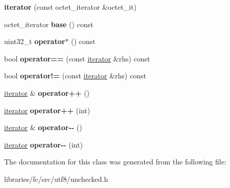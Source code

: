 \begin{DoxyCompactItemize}
\item 
\mbox{\label{classutf8_1_1unchecked_1_1iterator_a0f93d81989f2eb1038c0550431b9653b}} 
{\bfseries iterator} (const octet\+\_\+iterator \&octet\+\_\+it)
\item 
\mbox{\label{classutf8_1_1unchecked_1_1iterator_a475cd482cf1ff3aeb8d858d580a2e27a}} 
octet\+\_\+iterator {\bfseries base} () const
\item 
\mbox{\label{classutf8_1_1unchecked_1_1iterator_a150ab57c3546d067d49214af4d317e97}} 
uint32\+\_\+t {\bfseries operator$\ast$} () const
\item 
\mbox{\label{classutf8_1_1unchecked_1_1iterator_aa2bb05a12c371c1cb105a66607159059}} 
bool {\bfseries operator==} (const \mbox{\hyperlink{classutf8_1_1unchecked_1_1iterator}{iterator}} \&rhs) const
\item 
\mbox{\label{classutf8_1_1unchecked_1_1iterator_a28c371e85ff2ef99fe33eb3ce9182f05}} 
bool {\bfseries operator!=} (const \mbox{\hyperlink{classutf8_1_1unchecked_1_1iterator}{iterator}} \&rhs) const
\item 
\mbox{\label{classutf8_1_1unchecked_1_1iterator_a0450ee39cf7eeed074d229fb9b6b22bc}} 
\mbox{\hyperlink{classutf8_1_1unchecked_1_1iterator}{iterator}} \& {\bfseries operator++} ()
\item 
\mbox{\label{classutf8_1_1unchecked_1_1iterator_ae1cadaddd5c1db5518def5af491a1ff1}} 
\mbox{\hyperlink{classutf8_1_1unchecked_1_1iterator}{iterator}} {\bfseries operator++} (int)
\item 
\mbox{\label{classutf8_1_1unchecked_1_1iterator_a8b50b3a0d7b2c2506e135db73a636c7b}} 
\mbox{\hyperlink{classutf8_1_1unchecked_1_1iterator}{iterator}} \& {\bfseries operator-\/-\/} ()
\item 
\mbox{\label{classutf8_1_1unchecked_1_1iterator_a85597f5ae4bd175edb6dc2fc9ceb2f34}} 
\mbox{\hyperlink{classutf8_1_1unchecked_1_1iterator}{iterator}} {\bfseries operator-\/-\/} (int)
\end{DoxyCompactItemize}


The documentation for this class was generated from the following file\+:\begin{DoxyCompactItemize}
\item 
libraries/fc/src/utf8/unchecked.\+h\end{DoxyCompactItemize}
